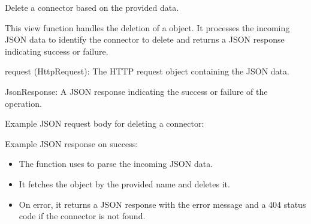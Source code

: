 \documentclass[letterpaper,10pt,english]{sphinxmanual}
\begin{document}
\begin{fulllineitems}
\label{\detokenize{app:app.views.delete_connector}}
\pysigstartsignatures
{}
\pysigstopsignatures
\sphinxAtStartPar
Delete a connector based on the provided data.

\sphinxAtStartPar
This view function handles the deletion of a  object. It processes 
the incoming JSON data to identify the connector to delete and returns a 
JSON response indicating success or failure.
\begin{description}
\sphinxAtStartPar
request (HttpRequest): The HTTP request object containing the JSON data.

\sphinxAtStartPar
JsonResponse: A JSON response indicating the success or failure of the operation.

\sphinxAtStartPar
Example JSON request body for deleting a connector:

\begin{sphinxVerbatim}[commandchars=\\\{\}]
\end{sphinxVerbatim}

\sphinxAtStartPar
Example JSON response on success:

\begin{sphinxVerbatim}[commandchars=\\\{\}]
\end{sphinxVerbatim}

\begin{itemize}
\item {} 
\sphinxAtStartPar
The function uses  to parse the incoming JSON data.

\item {} 
\sphinxAtStartPar
It fetches the  object by the provided name and deletes it.

\item {} 
\sphinxAtStartPar
On error, it returns a JSON response with the error message and a 404 status code if the connector is not found.

\end{itemize}

\end{description}

\end{fulllineitems}
\end{document}
